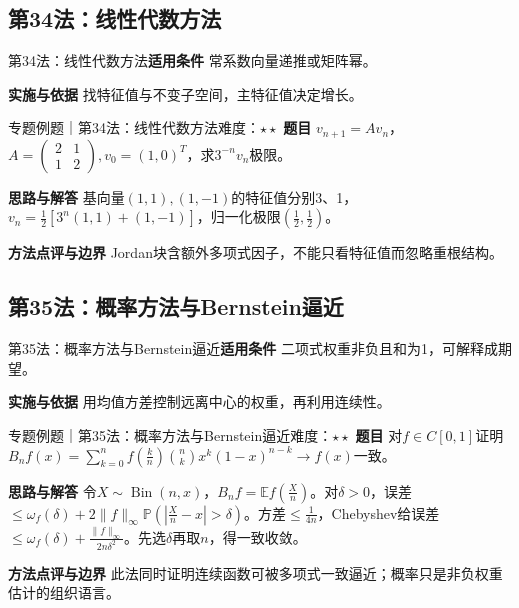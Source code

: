 \subsection{第34法：线性代数方法}\label{mat:limits_35:k34}
\begin{method}{第34法：线性代数方法}\textbf{适用条件} 常系数向量递推或矩阵幂。\par\textbf{实施与依据} 找特征值与不变子空间，主特征值决定增长。\end{method}
\begin{example}{专题例题｜第34法：线性代数方法}{难度：$\star\star$}
\textbf{题目} $v_{n+1}=Av_n$，$A=\begin{pmatrix}2&1\\1&2\end{pmatrix},v_0=(1,0)^T$，求$3^{-n}v_n$极限。\par\textbf{思路与解答} 基向量$(1,1),(1,-1)$的特征值分别3、1，$v_n=\frac12[3^n(1,1)+(1,-1)]$，归一化极限$(\frac{1}{2},\frac{1}{2})$。\par\textbf{方法点评与边界} Jordan块含额外多项式因子，不能只看特征值而忽略重根结构。
\end{example}
\subsection{第35法：概率方法与Bernstein逼近}\label{mat:limits_35:k35}
\begin{method}{第35法：概率方法与Bernstein逼近}\textbf{适用条件} 二项式权重非负且和为1，可解释成期望。\par\textbf{实施与依据} 用均值方差控制远离中心的权重，再利用连续性。\end{method}
\begin{example}{专题例题｜第35法：概率方法与Bernstein逼近}{难度：$\star\star$}
\textbf{题目} 对$f\in C[0,1]$证明$B_nf(x)=\sum_{k=0}^nf(\frac{k}{n})\binom nkx^k(1-x)^{n-k}\to f(x)$一致。\par\textbf{思路与解答} 令$X\sim\operatorname{Bin}(n,x)$，$B_nf=\mathbb E f(\frac{X}{n})$。对$\delta>0$，误差$\le\omega_f(\delta)+2\|f\|_\infty\mathbb P(|\frac{X}{n}-x|>\delta)$。方差$\le\frac{1}{4n}$，Chebyshev给误差$\le\omega_f(\delta)+\frac{\|f\|_\infty}{2n\delta^2}$。先选$\delta$再取$n$，得一致收敛。\par\textbf{方法点评与边界} 此法同时证明连续函数可被多项式一致逼近；概率只是非负权重估计的组织语言。
\end{example}
